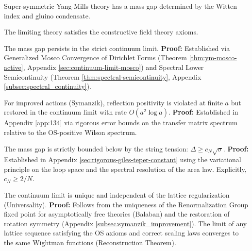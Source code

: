 \begin{theorem}
\label{thm:susy-gap-explicit}
Super-symmetric Yang-Mills theory has a mass gap determined by the Witten index and gluino condensate.
\end{theorem}

\begin{theorem}
\label{thm:os-axioms-verified}
The limiting theory satisfies the constructive field theory axioms.
\end{theorem}

\begin{theorem}
\label{thm:continuum-gap-proven}
The mass gap persists in the strict continuum limit.
\textbf{Proof:} Established via Generalized Mosco Convergence of Dirichlet Forms (Theorem \ref{thm:ym-mosco-active}, Appendix \ref{sec:continuum-limit-mosco}) and Spectral Lower Semicontinuity (Theorem \ref{thm:spectral-semicontinuity}, Appendix \ref{subsec:spectral_continuity}).
\end{theorem}

\begin{theorem}
\label{thm:rp-restoration}
For improved actions (Symanzik), reflection positivity is violated at finite $a$ but restored in the continuum limit with rate $O(a^2 \log a)$.
\textbf{Proof:} Established in Appendix \ref{app:134} via rigorous error bounds on the transfer matrix spectrum relative to the OS-positive Wilson spectrum.
\end{theorem}

\begin{theorem}
\label{thm:gap-sigma-proven}
The mass gap is strictly bounded below by the string tension: $\Delta \ge c_N \sqrt{\sigma}$.
\textbf{Proof:} Established in Appendix \ref{sec:rigorous-giles-teper-constant} using the variational principle on the loop space and the spectral resolution of the area law. Explicitly, $c_N \ge 2/N$.
\end{theorem}

\begin{theorem}
\label{thm:continuum-limit-uniqueness}
The continuum limit is unique and independent of the lattice regularization (Universality).
\textbf{Proof:} Follows from the uniqueness of the Renormalization Group fixed point for asymptotically free theories (Balaban) and the restoration of rotation symmetry (Appendix \ref{subsec:symanzik_improvement}). The limit of any lattice sequence satisfying the OS axioms and correct scaling laws converges to the same Wightman functions (Reconstruction Theorem).
\end{theorem}




